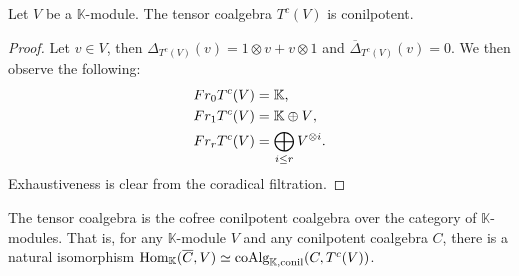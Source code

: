 \documentclass[../thesis.tex]{subfiles}
\begin{document}
            \begin{proposition}\label{prop: conilpotent-tensor}
                Let $V$ be a $\mathbb{K}$-module. The tensor coalgebra $T^c(V)$ is conilpotent.
            \end{proposition}

            \begin{proof}
                Let $v\in V$, then $\Delta_{T^c(V)}(v)=1\otimes v + v\otimes 1$ and $\overline{\Delta}_{T^c(V)}(v)=0$. We then observe the following:
                \begin{align*}
                    Fr_0T^c(V) & = \mathbb{K}\tt{,} \\
                    Fr_1T^c(V) & = \mathbb{K} \oplus V\tt{,} \\
                    Fr_rT^c(V) & = \bigoplus_{i\leq r} V^{\otimes i}\tt{.}
                \end{align*}
                Exhaustiveness is clear from the coradical filtration.
            \end{proof}

            \begin{proposition}\label{prop: cofree-tensor}
                The tensor coalgebra is the cofree conilpotent coalgebra over the category of $\mathbb{K}$-modules. That is, for any $\mathbb{K}$-module $V$ and any conilpotent coalgebra $C$, there is a natural isomorphism $\tt{Hom}_{\mathbb{K}}(\overline{C}, V)\simeq \tt{coAlg}_{\mathbb{K},\tt{conil}}(C, T^c(V))$.
            \end{proposition}
\end{document}
